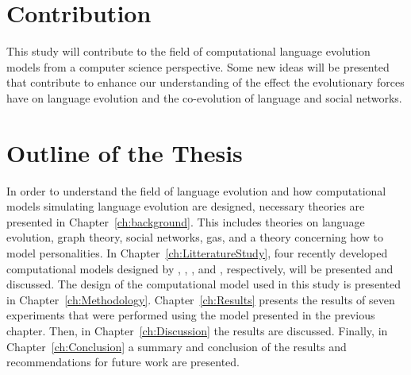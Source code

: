 \section{Contribution}
This study will contribute to the field of computational language evolution models from a computer science perspective. Some new ideas will be presented that contribute to enhance our understanding of the effect the evolutionary forces have on language evolution and the co-evolution of language and social networks.

\section{Outline of the Thesis}
In order to understand the field of language evolution and how computational models simulating language evolution are designed, necessary theories are presented in Chapter~\ref{ch:background}. This includes theories on language evolution, graph theory, social networks, \acp{ga}, and a theory concerning how to model personalities. In Chapter~\ref{ch:LitteratureStudy}, four recently developed computational models designed by \citeauthor{gong2011simulating}, \citeauthor{lipowska2011naming}, \citeauthor{lekvam2014co}, and \citeauthor{munroe2002learning}, respectively, will be presented and discussed. The design of the computational model used in this study is presented in Chapter~\ref{ch:Methodology}. Chapter~\ref{ch:Results} presents the results of seven experiments that were performed using the model presented in the previous chapter. Then, in Chapter~\ref{ch:Discussion} the results are discussed. Finally, in Chapter~\ref{ch:Conclusion} a summary and conclusion of the results and recommendations for future work are presented.      




